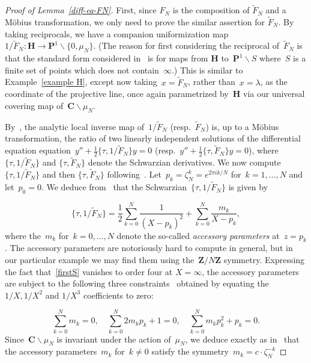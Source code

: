 \documentclass[10pt]{amsart}
\def\SSS{\S}
\renewcommand\setminus{\smallsetminus}
\def\wF{\widetilde{F}}
\def\Z{\mathbf{Z}}
\theoremstyle{remark}
\numberwithin{equation}{subsection}
\def\numequation{\addtocounter{subsubsection}{1}\begin{equation}}
\def\C{\mathbf{C}}
\def\H{\mathbf{H}}
\begin{document}
\begin{proof}[Proof of Lemma~\ref{diff-eq-FN}]
First, since $F_N$ is the composition of $\wF_N$ and a M\"{o}bius transformation, we only need to prove the similar assertion for $\wF_N$.  By taking reciprocals,
we have a companion uniformization map~$1/\wF_N: \H \rightarrow \mathbf{P}^1 \setminus \{0,\mu_N\}$. (The reason for first considering the reciprocal of~$\wF_N$ is that the standard form considered in~\cite{Hempel}
is for maps from $\H$ to~$\mathbf{P}^1 \setminus S$ where~$S$ is a finite set of points which does not contain~$\infty$.) This is similar to Example~\ref{example H}, except now taking~$x = \wF_N$, rather than~$x=\lambda$, as the coordinate of the projective line, once again parametrized by~$\H$ via our universal covering map of~$\C \setminus \mu_N$. 

By~\cite[Lemma~3.3]{Hempel}, the analytic local
inverse map of~$1/\wF_N$ (resp.~$\wF_N$) is, up to a M\"{o}bius transformation, the ratio of two linearly independent solutions of the differential equation equation~$y'' + \frac{1}{2} \{\tau,1/\wF_N\} y=  0$ (resp.~$y'' + \frac{1}{2} \{\tau,\wF_N\} y=  0$), where $\{ \tau, 1/\wF_N\}$ and $\{ \tau, \wF_N\}$ denote the Schwarzian derivatives.
 We now compute $\{ \tau, 1/\wF_N\}$ and then $\{ \tau, \wF_N\}$ following~\cite[\SSS~3, \SSS~6]{Hempel}.
Let~$p_k =  \zeta_N^k = e^{2 \pi i k/N}$ for~$k = 1, \ldots, N$ and let~$p_0 = 0$.
We deduce from~\cite[Theorem~3.1]{Hempel} that
the Schwarzian~$\{\tau,1/\wF_N\}$ is given by
\numequation 
\label{firstS}
\{\tau,1/\wF_N\} = \frac{1}{2} \sum_{k=0}^{N} \frac{1}{(X - p_k)^2}
 + \sum_{k=0}^{N} \frac{m_k}{X - p_k},
 \end{equation}
 where the~$m_k$ for~$k = 0 ,\ldots, N$ denote the so-called \emph{accessory parameters} at~$z = p_k$.
The accessory parameters are notoriously hard to compute in general, but  in our particular example we may find them using the~$\Z/N \Z$ symmetry.
Expressing the fact that~\eqref{firstS} vanishes to order four at $X = \infty$, the accessory parameters are subject to the following three constraints~\cite[Theorem~3.1]{Hempel} obtained by equating the $1/X, 1/X^2$ and $1/X^3$ coefficients to zero:
\numequation
\label{constraints}
\sum_{k=0}^{N} m_k = 0, \quad \sum_{k=0}^{N} 2 m_k p_k + 1 = 0, \quad \sum_{k=0}^{N} m_k p^2_k + p_k = 0.
\end{equation}
Since~$\mathbf{C} \setminus \mu_N$ is invariant under the action of~$\mu_N$, we deduce
exactly as
 in~\cite[\SSS~6, Example~1]{Hempel} that
 the accessory parameters~$m_k$ for~$k \ne 0$ satisfy the symmetry~$m_k = c \cdot \zeta_N^{-k}$

\end{proof}
\end{document}
